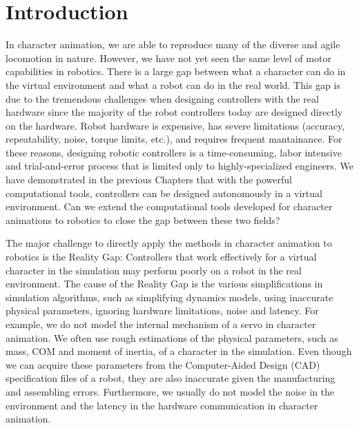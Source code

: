 \section{Introduction}

In character animation, we are able to reproduce many of the diverse and agile locomotion in nature. However, we have not yet seen the same level of motor capabilities in robotics. There is a large gap between what a character can do in the virtual environment and what a robot can do in the real world. This gap is due to the tremendous challenges when designing controllers with the real hardware since the majority of the robot controllers today are designed directly on the hardware. Robot hardware is expensive, has severe limitations (accuracy, repeatability, noise, torque limits, etc.), and requires frequent mantainance. For these reasons, designing robotic controllers is a time-consuming, labor intensive and trial-and-error process that is limited only to highly-specialized engineers. We have demonstrated in the previous Chapters that with the powerful computational tools, controllers can be designed autonomously in a virtual environment. Can we extend the computational tools developed for character animations to robotics to close the gap between these two fields?

The major challenge to directly apply the methods in character animation to robotics is the Reality Gap: Controllers that work effectively for a virtual character in the simulation may perform poorly on a robot in the real environment. The cause of the Reality Gap is the various simplifications in simulation algorithms, such as simplifying dynamics models, using inaccurate physical parameters, ignoring hardware limitations, noise and latency. For example, we do not model the internal mechanism of a servo in character animation. We often use rough estimations of the physical parameters, such as mass, COM and moment of inertia, of a character in the simulation. Even though we can acquire these parameters from the Computer-Aided Design (CAD) specification files of a robot, they are also inaccurate given the manufacturing and assembling errors. Furthermore, we usually do not model the noise in the environment and the latency in the hardware communication in character animation.

